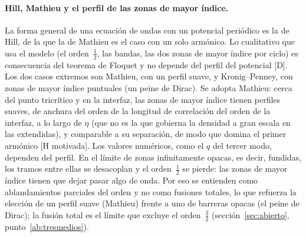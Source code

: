 \documentclass[11pt,a4paper]{article}
\newcommand{\st}[1]{\textup{[#1]}}
\newcommand{\apartado}[1]{\paragraph{#1}}
\begin{document}
\apartado{Hill, Mathieu y el perfil de las zonas de mayor índice.} La forma general de una ecuación de ondas con un potencial periódico es la de Hill, de la que la de Mathieu es el caso con un solo armónico. Lo cualitativo que usa el modelo (el orden~$\tfrac12$, las bandas, las dos zonas de mayor índice por ciclo) es consecuencia del teorema de Floquet y no depende del perfil del potencial \st{D}. Los dos casos extremos son Mathieu, con un perfil suave, y Kronig--Penney, con zonas de mayor índice puntuales (un peine de Dirac). Se adopta Mathieu: cerca del punto tricrítico y en la interfaz, las zonas de mayor índice tienen perfiles suaves, de anchura del orden de la longitud de correlación del orden de la interfaz, a lo largo de $\eta$ (que no es la que gobierna la densidad a gran escala en las extendidas), y comparable a su separación, de modo que domina el primer armónico \st{H motivada}. Los valores numéricos, como el $q$ del tercer modo, dependen del perfil. En el límite de zonas infinitamente opacas, es decir, fundidas, los tramos entre ellas se desacoplan y el orden~$\tfrac12$ se pierde: las zonas de mayor índice tienen que dejar pasar algo de onda. Por eso se entienden como ablandamientos parciales del orden y no como fusiones totales, lo que refuerza la elección de un perfil suave (Mathieu) frente a uno de barreras opacas (el peine de Dirac); la fusión total es el límite que excluye el orden~$\tfrac32$ (sección~\ref{sec:abierto}, punto~\ref{ab:tresmedios}).
\end{document}
